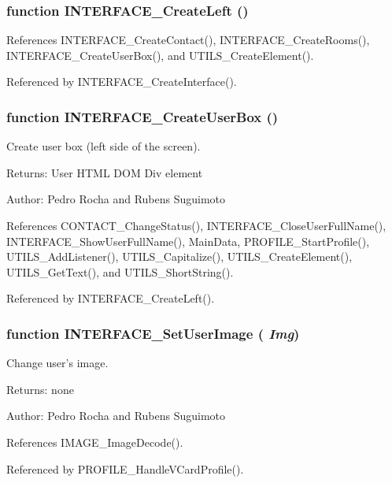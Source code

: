 \subsubsection[INTERFACE\_\-CreateLeft]{\setlength{\rightskip}{0pt plus 5cm}function INTERFACE\_\-CreateLeft ()}\label{left_8js_6773b1f1613b8bf92b8443e4451130d8}




References INTERFACE\_\-CreateContact(), INTERFACE\_\-CreateRooms(), INTERFACE\_\-CreateUserBox(), and UTILS\_\-CreateElement().

Referenced by INTERFACE\_\-CreateInterface().
\subsubsection[INTERFACE\_\-CreateUserBox]{\setlength{\rightskip}{0pt plus 5cm}function INTERFACE\_\-CreateUserBox ()}\label{left_8js_3fd128c6f241195f38df059e275858e5}


Create user box (left side of the screen). 

\begin{Desc}
\item[Returns:]User HTML DOM Div element \end{Desc}
\begin{Desc}
\item[Author:]Pedro Rocha and Rubens Suguimoto \end{Desc}


References CONTACT\_\-ChangeStatus(), INTERFACE\_\-CloseUserFullName(), INTERFACE\_\-ShowUserFullName(), MainData, PROFILE\_\-StartProfile(), UTILS\_\-AddListener(), UTILS\_\-Capitalize(), UTILS\_\-CreateElement(), UTILS\_\-GetText(), and UTILS\_\-ShortString().

Referenced by INTERFACE\_\-CreateLeft().
\subsubsection[INTERFACE\_\-SetUserImage]{\setlength{\rightskip}{0pt plus 5cm}function INTERFACE\_\-SetUserImage ( {\em Img})}\label{left_8js_21fc97ab34d09cf3c54dd41359a56574}


Change user's image. 

\begin{Desc}
\item[Returns:]none \end{Desc}
\begin{Desc}
\item[Author:]Pedro Rocha and Rubens Suguimoto \end{Desc}


References IMAGE\_\-ImageDecode().

Referenced by PROFILE\_\-HandleVCardProfile().